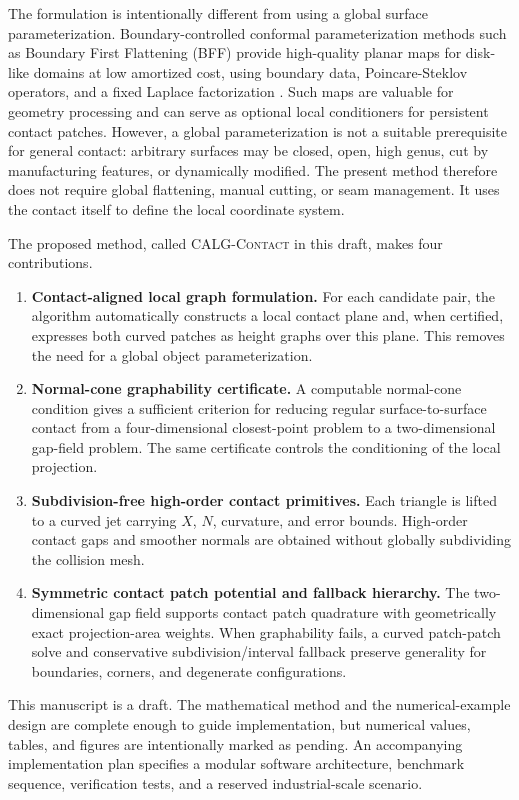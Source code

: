 \documentclass[preprint,12pt]{elsarticle}
\newcommand{\method}{\textsc{CALG-Contact}}
\begin{document}
The formulation is intentionally different from using a global surface parameterization. Boundary-controlled conformal parameterization methods such as Boundary First Flattening (BFF) provide high-quality planar maps for disk-like domains at low amortized cost, using boundary data, Poincare-Steklov operators, and a fixed Laplace factorization \cite{sawhney2018bff}. Such maps are valuable for geometry processing and can serve as optional local conditioners for persistent contact patches. However, a global parameterization is not a suitable prerequisite for general contact: arbitrary surfaces may be closed, open, high genus, cut by manufacturing features, or dynamically modified. The present method therefore does not require global flattening, manual cutting, or seam management. It uses the contact itself to define the local coordinate system.

The proposed method, called \method{} in this draft, makes four contributions.
\begin{enumerate}[leftmargin=*,label=(\roman*)]
    \item \textbf{Contact-aligned local graph formulation.} For each candidate pair, the algorithm automatically constructs a local contact plane and, when certified, expresses both curved patches as height graphs over this plane. This removes the need for a global object parameterization.
    \item \textbf{Normal-cone graphability certificate.} A computable normal-cone condition gives a sufficient criterion for reducing regular surface-to-surface contact from a four-dimensional closest-point problem to a two-dimensional gap-field problem. The same certificate controls the conditioning of the local projection.
    \item \textbf{Subdivision-free high-order contact primitives.} Each triangle is lifted to a curved jet carrying $X$, $N$, curvature, and error bounds. High-order contact gaps and smoother normals are obtained without globally subdividing the collision mesh.
    \item \textbf{Symmetric contact patch potential and fallback hierarchy.} The two-dimensional gap field supports contact patch quadrature with geometrically exact projection-area weights. When graphability fails, a curved patch-patch solve and conservative subdivision/interval fallback preserve generality for boundaries, corners, and degenerate configurations.
\end{enumerate}

This manuscript is a draft. The mathematical method and the numerical-example design are complete enough to guide implementation, but numerical values, tables, and figures are intentionally marked as pending. An accompanying implementation plan specifies a modular software architecture, benchmark sequence, verification tests, and a reserved industrial-scale scenario.
\end{document}
